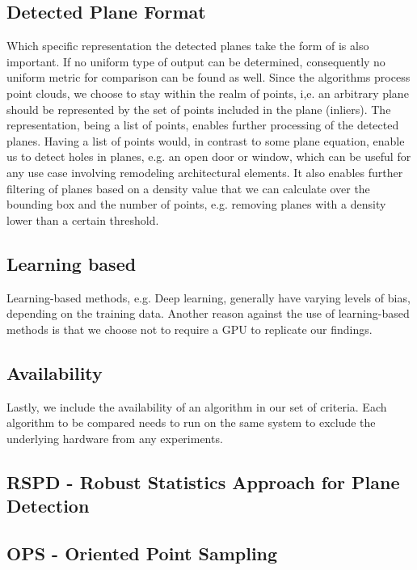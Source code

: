 \documentclass[main.tex]{subfiles}
\begin{document}
\subsection*{Detected Plane Format}
Which specific representation the detected planes take the form of is also important.
If no uniform type of output can be determined, consequently no uniform metric for comparison can be found as well.
Since the algorithms process point clouds, we choose to stay within the realm of points, i,e. an arbitrary plane should be
represented by the set of points included in the plane (inliers).
The representation, being a list of points, enables further processing of the detected planes.
Having a list of points would, in contrast to some plane equation, enable us to detect holes in planes, e.g. an open door or window, which can be useful
for any use case involving remodeling architectural elements.
It also enables further filtering of planes based on a density value that we can calculate over the bounding box and the number of points, e.g.
removing planes with a density lower than a certain threshold.

\subsection*{Learning based}\label{subsec_learning_based}
Learning-based methods, e.g. Deep learning, generally have varying levels of bias, depending on the training data.
Another reason against the use of learning-based methods is that we choose not to require a GPU to replicate our findings.

\subsection*{Availability}
Lastly, we include the availability of an algorithm in our set of criteria.
Each algorithm to be compared needs to run on the same system to exclude the underlying hardware from any experiments.\\



\subsection*{RSPD - Robust Statistics Approach for Plane Detection}

\subsection*{OPS - Oriented Point Sampling}
\newpage
\end{document}
